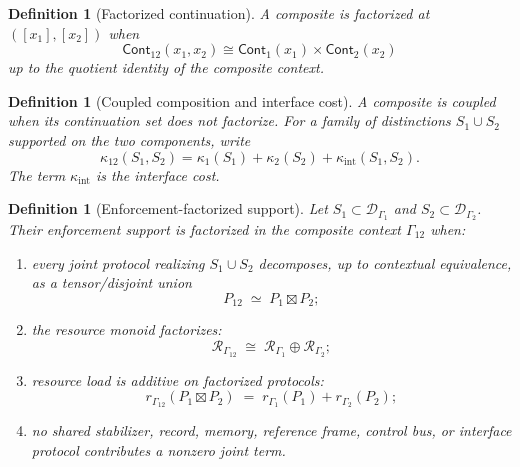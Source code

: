 \documentclass[11pt]{article}
\newtheorem{definition}[theorem]{Definition}
\newcommand{\Cont}{\mathsf{Cont}}
\begin{document}
\begin{definition}[Factorized continuation]
A composite is factorized at $([x_1],[x_2])$ when
\[
 \Cont_{12}(x_1,x_2)
 \cong
 \Cont_1(x_1)\times\Cont_2(x_2)
\]
up to the quotient identity of the composite context.
\end{definition}

\begin{definition}[Coupled composition and interface cost]
A composite is coupled when its continuation set does not factorize.  For a family of distinctions $S_1\cup S_2$ supported on the two components, write
\begin{equation}\label{eq:kappa-12-interface}
 \kappa_{12}(S_1,S_2)
 =\kappa_1(S_1)+\kappa_2(S_2)+\kappa_{\mathrm{int}}(S_1,S_2).
\end{equation}
The term $\kappa_{\mathrm{int}}$ is the interface cost.
\end{definition}

\begin{definition}[Enforcement-factorized support]\label{def:enforcement-factorized-support}
Let $S_1\subset\mathcal D_{\Gamma_1}$ and $S_2\subset\mathcal D_{\Gamma_2}$.
Their enforcement support is \emph{factorized} in the composite context
$\Gamma_{12}$ when:
\begin{enumerate}[label=(\roman*),leftmargin=2em]
\item every joint protocol realizing $S_1\cup S_2$ decomposes, up to
contextual equivalence, as a tensor/disjoint union
\[
    P_{12}\;\simeq\;P_1\boxtimes P_2;
\]
\item the resource monoid factorizes:
\[
    \mathcal R_{\Gamma_{12}}
    \;\cong\;
    \mathcal R_{\Gamma_1}\oplus\mathcal R_{\Gamma_2};
\]
\item resource load is additive on factorized protocols:
\[
    r_{\Gamma_{12}}(P_1\boxtimes P_2)
    \;=\;
    r_{\Gamma_1}(P_1)+r_{\Gamma_2}(P_2);
\]
\item no shared stabilizer, record, memory, reference frame, control
bus, or interface protocol contributes a nonzero joint term.
\end{enumerate}
\end{definition}
\end{document}
